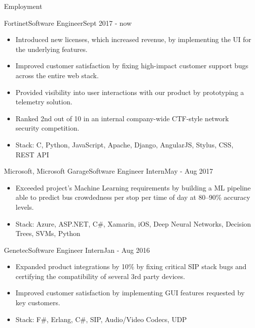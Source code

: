 \documentclass[]{muchicv}
\begin{document}
	\makeheader
	
	\begin{cvsection}{Employment}
		\begin{cvsubsection}{Fortinet}{Software Engineer}{Sept 2017 - now}
			\begin{itemize}
				\item Introduced new licenses, which increased revenue, by implementing the UI for the underlying features.
				\item Improved customer satisfaction by fixing high-impact customer support bugs across the entire web stack.
				\item Provided visibility into user interactions with our product by prototyping a telemetry solution.
				\item Ranked 2nd out of 10 in an internal company-wide CTF-style network security competition.
				\item Stack: C, Python, JavaScript, Apache, Django, AngularJS, Stylus, CSS, REST API
			\end{itemize}
		\end{cvsubsection}
		
		\begin{cvsubsection}{Microsoft, Microsoft Garage}{Software Engineer Intern}{May - Aug 2017}
			\begin{itemize}
				\item Exceeded project's Machine Learning requirements by building a ML pipeline able to predict bus crowdedness per stop per time of day at 80--90\% accuracy levels.
				\item Stack: Azure, ASP.NET, C\#, Xamarin, iOS, Deep Neural Networks, Decision Trees, SVMs, Python
			\end{itemize}
		\end{cvsubsection}
		
		\begin{cvsubsection}{Genetec}{Software Engineer Intern}{Jan - Aug 2016}
			\begin{itemize}
				\item Expanded product integrations by 10\% by fixing critical SIP stack bugs and certifying the compatibility of several 3rd party devices.
				\item Improved customer satisfaction by implementing GUI features requested by key customers.
				\item Stack: F\#, Erlang, C\#, SIP, Audio/Video Codecs, UDP
			\end{itemize}
		\end{cvsubsection}


\end{cvsection}
\end{document}
